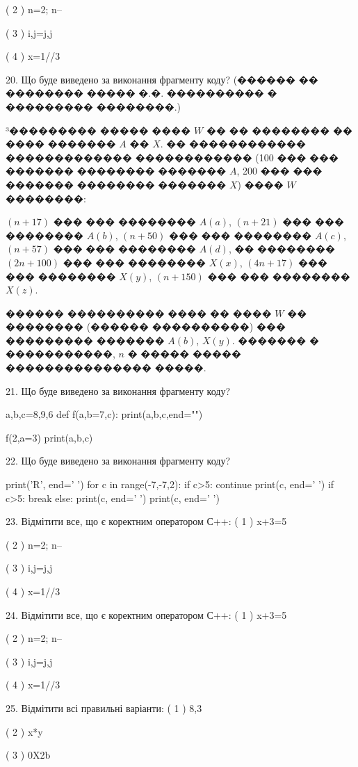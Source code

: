 \documentclass[11pt]{article}
\begin{document}
( 2 ) n=2; n--

( 3 ) i,j=j,j

( 4 ) x=1//3

20. Що буде виведено за виконання фрагменту коду?
(������ �� �������� ����� �.�. ���������� � ��������� ��������.)\par {\hspace {0.5 cm}}³��������� ����� ���� $W$ �� �� �������� �� ���� ������� $A$ �� $X$. �� ������������ ������������� ������������ (100 ��� ��� ������� �������� ������� $A$,  200 ��� ��� ������� �������� ������� $X$) ���� $W$ ��������:\par {\hspace {0.5 cm}}$(n+17)$ ��� ��� �������� $A(a)$, $(n+21)$ ��� ��� �������� $A(b)$, $(n+50)$ ��� ��� �������� $A(c)$, $(n+57)$ ��� ��� �������� $A(d)$, �� �������� $(2n+100)$ ��� ��� �������� $X(x)$, $(4n+17)$ ��� ��� �������� $X(y)$, $(n+150)$ ��� ��� �������� $X(z)$.\par
{\hspace {0.5 cm}}������ ���������� ���� �� ���� $W$ �� �������� (������ ����������) ��� ��������� ������� $A(b)$, $X(y)$. ������� � �����������, $n$ � ����� ����� ��������������� �����.\par
21. Що буде виведено за виконання фрагменту коду?

a,b,c=8,9,6
def f(a,b=7,c):
    print(a,b,c,end="")

f(2,a=3)
print(a,b,c)


22. Що буде виведено за виконання фрагменту коду?

print('R', end=' ')
for c in range(-7,-7,2):
    if c>5:
        continue
        print(c, end=' ')
    if c>5:
        break
    else:
        print(c, end=' ')
    print(c, end=' ')

23. Відмітити все, що є коректним оператором С++:
( 1 ) x+3=5

( 2 ) n=2; n--

( 3 ) i,j=j,j

( 4 ) x=1//3

24. Відмітити все, що є коректним оператором С++:
( 1 ) x+3=5

( 2 ) n=2; n--

( 3 ) i,j=j,j

( 4 ) x=1//3

25. Відмітити всі правильні варіанти:
( 1 ) 8,3

( 2 ) x*y

( 3 ) 0X2b
\end{document}

